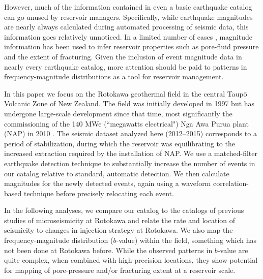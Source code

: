 However, much of the information contained in even a basic earthquake catalog can go unused by reservoir managers. Specifically, while earthquake magnitudes are nearly always calculated during automated processing of seismic data, this information goes relatively unnoticed. In a limited number of cases \citep[e.g.][]{Bachmann_2012}, magnitude information has been used to infer reservoir properties such as pore-fluid pressure and the extent of fracturing. Given the inclusion of event magnitude data in nearly every earthquake catalog, more attention should be paid to patterns in frequency-magnitude distributions as a tool for reservoir management.

In this paper we focus on the Rotokawa geothermal field in the central Taup\={o} Volcanic Zone of New Zealand. The field was initially developed in 1997 but has undergone large-scale development since that time, most significantly the commissioning of the 140 MWe (``megawatts electrical") Nga Awa Purua plant (NAP) in 2010 \citep{McNamara_2016}. The seismic dataset analyzed here (2012--2015) corresponds to a period of stabilization, during which the reservoir was equilibrating to the increased extraction required by the installation of NAP. We use a matched-filter earthquake detection technique to substantially increase the number of events in our catalog relative to standard, automatic detection. We then calculate magnitudes for the newly detected events, again using a waveform correlation-based technique before precisely relocating each event. 

In the following analyses, we compare our catalog to the catalogs of previous studies of microseismicity at Rotokawa \citep{Sewell_2015WGC,Sherburn_2015} and relate the rate and location of seismicity to changes in injection strategy at Rotokawa. We also map the frequency-magnitude distribution ($b$-value) within the field, something which has not been done at Rotokawa before. While the observed patterns in $b$-value are quite complex, when combined with high-precision locations, they show potential for mapping of pore-pressure and/or fracturing extent at a reservoir scale.


